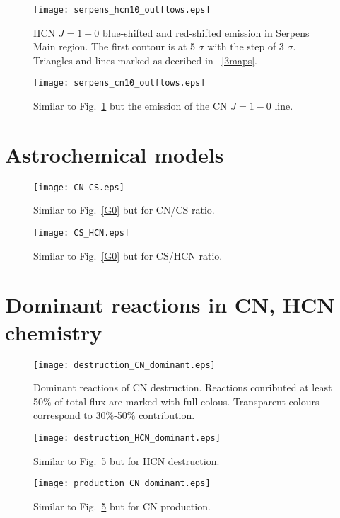 \documentclass{aa}
\begin{document}
\begin{appendix}
\begin{figure}
\texttt{[image: serpens\_hcn10\_outflows.eps]}
\caption{HCN $J=1-0$ blue-shifted and red-shifted emission in Serpens Main region. The first contour is at 5 $\sigma$ with the step of 3 $\sigma$. Triangles and lines marked as decribed in ~\ref{3maps}.}
\label{hcn10_blue_red}
\end{figure}

\begin{figure}
\texttt{[image: serpens\_cn10\_outflows.eps]}
\caption{Similar to Fig.~\ref{hcn10_blue_red} but the emission of the CN $J=1-0$ line.}
\label{cn10_blue_red}
\end{figure}

\section{Astrochemical models}
\begin{figure}
   \centering
   \texttt{[image: CN\_CS.eps]}
      \caption{Similar to Fig.~\ref{G0} but for CN/CS ratio.}
         \label{CN/CS}
   \end{figure}

\begin{figure}
   \centering
   \texttt{[image: CS\_HCN.eps]}
      \caption{Similar to Fig.~\ref{G0} but for CS/HCN ratio.}
         \label{CS/HCN}
   \end{figure}

\section{Dominant reactions in CN, HCN chemistry}

\begin{figure}
\texttt{[image: destruction\_CN\_dominant.eps]}
\caption{Dominant reactions of CN destruction. Reactions conributed at least 50$\%$ of total flux are marked with full colous. Transparent colours correspond to 30$\%$-50$\%$ contribution.}
\label{CN_dest}
\end{figure}

\begin{figure}
\texttt{[image: destruction\_HCN\_dominant.eps]}
\caption{Similar to Fig.~\ref{CN_dest} but for HCN destruction.}
\label{HCN_dest}
\end{figure}

\begin{figure}
\texttt{[image: production\_CN\_dominant.eps]}
\caption{Similar to Fig.~\ref{CN_dest} but for CN production.}
\label{CN_prod}
\end{figure}


\end{appendix}
\end{document}

